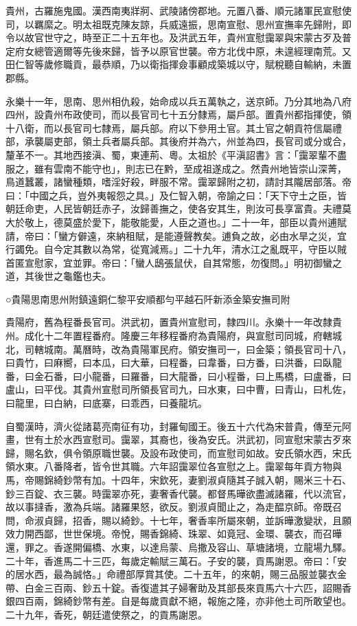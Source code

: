 
\begin{pinyinscope}
貴州，古羅施鬼國。漢西南夷牂牁、武陵諸傍郡地。元置八番、順元諸軍民宣慰使司，以羈縻之。明太祖既克陳友諒，兵威遠振，思南宣慰、思州宣撫率先歸附，即令以故官世守之，時至正二十五年也。及洪武五年，貴州宣慰靄翠與宋蒙古歹及普定府女總管適爾等先後來歸，皆予以原官世襲。帝方北伐中原，未遑經理南荒。又田仁智等歲修職貢，最恭順，乃以衛指揮僉事顧成築城以守，賦稅聽自輸納，未置郡縣。

永樂十一年，思南、思州相仇殺，始命成以兵五萬執之，送京師。乃分其地為八府四州，設貴州布政使司，而以長官司七十五分隸焉，屬戶部。置貴州都指揮使，領十八衛，而以長官司七隸焉，屬兵部。府以下參用土官。其土官之朝貢符信屬禮部，承襲屬吏部，領土兵者屬兵部。其後府并為六，州並為四，長官司或分或合，釐革不一。其地西接滇、蜀，東連荊、粵。太祖於《平滇詔書》言：「靄翠輩不盡服之，雖有雲南不能守也」，則志已在黔，至成祖遂成之。然貴州地皆崇山深菁，鳥道蠶叢，諸蠻種類，嗜淫好殺，畔服不常。靄翠歸附之初，請討其隴居部落。帝曰：「中國之兵，豈外夷報怨之具。」及仁智入朝，帝諭之曰：「天下守土之臣，皆朝廷命吏，人民皆朝廷赤子，汝歸善撫之，使各安其生，則汝可長享富貴。夫禮莫大於敬上，德莫盛於愛下，能敬能愛，人臣之道也。」二十一年，部臣以貴州逋賦請，帝曰：「蠻方僻遠，來納租賦，是能遵聲教矣。逋負之故，必由水旱之災，宜行蠲免。自今定其數以為常，從寬減焉。」二十九年，清水江之亂既平，守臣以賊首匿宣慰家，宜並罪。帝曰：「蠻人鴟張鼠伏，自其常態，勿復問。」明初御蠻之道，其後世之龜鑑也夫。

○貴陽思南思州附鎮遠銅仁黎平安順都勻平越石阡新添金築安撫司附

貴陽府，舊為程番長官司。洪武初，置貴州宣慰司，隸四川。永樂十一年改隸貴州。成化十二年置程番府。隆慶三年移程番府為貴陽府，與宣慰司同城，府轄城北，司轄城南。萬曆時，改為貴陽軍民府。領安撫司一，曰金築；領長官司十八，曰貴竹，曰麻嚮，曰本瓜，曰大華，曰程番，曰韋番，曰方番，曰洪番，曰臥龍番，曰金石番，曰小龍番，曰羅番，曰大龍番，曰小程番，曰上馬橋，曰盧番，曰盧山，曰平伐。其貴州宣慰司所領長官司九，曰水東，曰中曹，曰青山，曰札佐，曰龍里，曰白納，曰底寨，曰乖西，曰養龍坑。

自蜀漢時，濟火從諸葛亮南征有功，封羅甸國王。後五十六代為宋普貴，傳至元阿畫，世有土於水西宣慰司。靄翠，其裔也，後為安氏。洪武初，同宣慰宋蒙古歹來歸，賜名欽，俱令領原職世襲。及設布政使司，而宣慰司如故。安氏領水西，宋氏領水東。八番降者，皆令世其職。六年詔靄翠位各宣慰之上。靄翠每年貢方物與馬，帝賜錦綺鈔幣有加。十四年，宋欽死，妻劉淑貞隨其子誠入朝，賜米三十石、鈔三百錠、衣三襲。時靄翠亦死，妻奢香代襲。都督馬曄欲盡滅諸羅，代以流官，故以事撻香，激為兵端。諸羅果怒，欲反。劉淑貞聞止之，為走醖京師。帝既召問，命淑貞歸，招香，賜以綺鈔。十七年，奢香率所屬來朝，並訴曄激變狀，且願效力開西鄙，世世保境。帝悅，賜香錦綺、珠翠、如竟冠、金環、襲衣，而召曄還，罪之。香遂開偏橋、水東，以達烏蒙、烏撒及容山、草塘諸境，立龍場九驛。二十年，香進馬二十三匹，每歲定輸賦三萬石。子安的襲，貢馬謝恩。帝曰：「安的居水西，最為誠恪。」命禮部厚賞其使。二十五年，的來朝，賜三品服並襲衣金帶、白金三百兩、鈔五十錠。香復遣其子婦奢助及其部長來貢馬六十六匹，詔賜香銀四百兩，錦綺鈔幣有差。自是每歲貢獻不絕，報施之隆，亦非他土司所敢望也。二十九年，香死，朝廷遣使祭之，的貢馬謝恩。


\end{pinyinscope}
